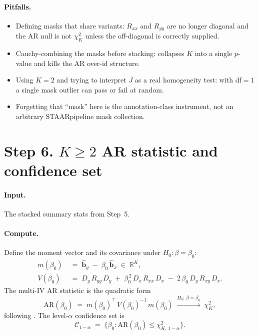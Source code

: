 \documentclass[11pt]{article}
\begin{document}
\paragraph{Pitfalls.}
\begin{itemize}
\item Defining masks that share variants: $R_{xx}$ and $R_{yy}$ are no longer diagonal and the AR null is not $\chi^2_K$ unless the off-diagonal is correctly supplied.
\item Cauchy-combining the masks before stacking: collapses $K$ into a single $p$-value and kills the AR over-id structure.
\item Using $K=2$ and trying to interpret $J$ as a real homogeneity test: with df$=1$ a single mask outlier can pass or fail at random.
\item Forgetting that ``mask'' here is the annotation-class instrument, not an arbitrary STAARpipeline mask collection.
\end{itemize}

\section*{Step 6. $K\ge 2$ AR statistic and confidence set}

\paragraph{Input.} The stacked summary stats from Step~5.

\paragraph{Compute.} Define the moment vector and its covariance under $H_0:\beta=\beta_0$:
\begin{align}
m(\beta_0) &\;=\; \hat{\boldsymbol b}_y \;-\; \beta_0\,\hat{\boldsymbol b}_x \;\in\; \mathbb{R}^K,
\label{eq:moment}\\[2pt]
V(\beta_0) &\;=\; D_y\, R_{yy}\, D_y \;+\; \beta_0^{\,2}\, D_x\, R_{xx}\, D_x \;-\; 2\,\beta_0\, D_y\, R_{xy}\, D_x.
\label{eq:Vbeta}
\end{align}
The multi-IV AR statistic is the quadratic form
\begin{equation}
\mathrm{AR}(\beta_0) \;=\; m(\beta_0)^\top\, V(\beta_0)^{-1}\, m(\beta_0) \;\xrightarrow{H_0:\,\beta=\beta_0}\; \chi^2_K,
\label{eq:ARKgeneral}
\end{equation}
following \citet{AndersonRubin1949,WangKang2022,PatelLaneBurgess2024}. The level-$\alpha$ confidence set is
\begin{equation}
\mathcal{C}_{1-\alpha} \;=\; \bigl\{\beta_0 : \mathrm{AR}(\beta_0) \le \chi^2_{K,\,1-\alpha}\bigr\}.
\label{eq:CSK2}
\end{equation}
\end{document}
